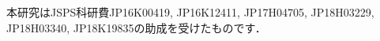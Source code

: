 \begin{acknowledgment}
    本研究はJSPS科研費JP16K00419, JP16K12411, JP17H04705, JP18H03229,
    JP18H03340, JP18K19835の助成を受けたものです．
\end{acknowledgment}






